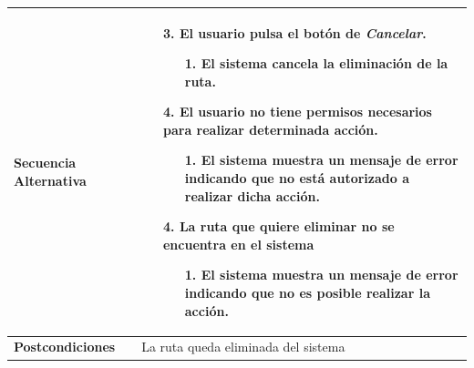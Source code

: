 \begin{longtable}{| p{4cm} | p{10cm} |}
\hline
\textbf{Secuencia Alternativa} &\mbox{}\par\vspace{-\baselineskip}
\begin{enumerate}[leftmargin=0.9cm, topsep=0.1cm]
\item[3.] El usuario pulsa el botón de \textit{Cancelar}.
	\begin{itemize}
	\item[1.] El sistema cancela la eliminación de la ruta.
	\end{itemize}
\item[4.] El usuario no tiene permisos necesarios para realizar determinada acción.
	\begin{itemize}
	\item[1.] El sistema muestra un mensaje de error indicando que no está autorizado a realizar dicha acción.
	\end{itemize}
\item[4.] La ruta que quiere eliminar no se encuentra en el sistema
	\begin{itemize}
	\item[1.] El sistema muestra un mensaje de error indicando que no es posible realizar la acción.
	\end{itemize}
\end{enumerate}

\\

\hline
\textbf{Postcondiciones} & 
La ruta queda eliminada del sistema\\
\hline
\end{longtable}


\newpage

